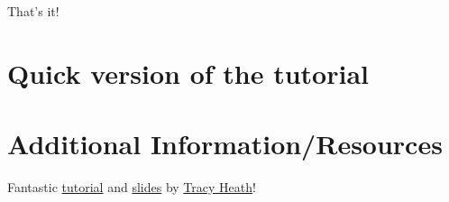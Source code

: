 \documentclass{article}
\begin{document}
That's it!

\newpage
\section{Quick version of the tutorial}
\setcounter{stepCounter}{0}
\renewcommand{\step}[2]{\addtocounter{stepCounter}{1} {\bf \hyperlink{step\arabic{stepCounter}}{Step \arabic{stepCounter}}:}\xspace #1\par}
\renewcommand{\intermediate}[1]{}


\newpage
\section{Additional Information/Resources}
Fantastic
\href{http://treethinkers.org/divergence-time-estimation-using-beast/}{tutorial}
and
\href{https://molevol.mbl.edu/wiki/images/6/6f/Bodega_2013_divtime_lecture.pdf}{slides}
by \href{http://phylo.bio.ku.edu/content/tracy-heath}{Tracy Heath}!

\newpage

\end{document}
